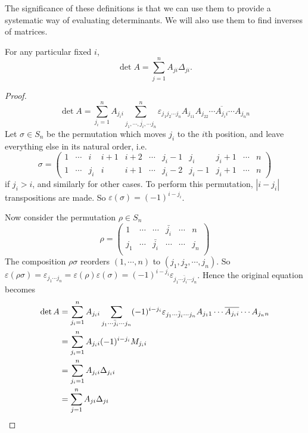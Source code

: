 \documentclass[a4paper]{article}
\begin{document}
The significance of these definitions is that we can use them to provide a systematic way of evaluating determinants. We will also use them to find inverses of matrices.
\begin{thm}
  For any particular fixed $i$,
  \[
    \det A = \sum_{j = 1}^{n} A_{ji}\Delta_{ji}.
  \]
\end{thm}
\begin{proof}
  \[
    \det A = \sum_{j_i = 1}^nA_{j_ii} \sum_{j_1, \cdots, \overline{j_i}, \cdots j_n}^n \varepsilon_{j_1j_2\cdots j_n} A_{j_11}A_{j_22}\cdots \overline{A_{j_ii}}\cdots A_{j_nn}
  \]
  Let $\sigma \in S_n$ be the permutation which moves $j_i$ to the $i$th position, and leave everything else in its natural order, i.e.\setcounter{MaxMatrixCols}{11}
  \[
    \sigma =
    \begin{pmatrix}
      1 &\cdots& i & i + 1 & i + 2 & \cdots &j_i - 1&j_i& j_i + 1 & \cdots & n\\
      1 & \cdots & j_i & i & i + 1 & \cdots & j_i - 2 & j_i - 1 & j_i + 1 & \cdots & n
    \end{pmatrix}
  \]
  if $j_i > i$, and similarly for other cases. To perform this permutation, $|i - j_i|$ transpositions are made. So $\varepsilon(\sigma) = (-1)^{i - j_i}$.

  Now consider the permutation $\rho\in S_n$
  \[
    \rho =
    \begin{pmatrix}
      1 & \cdots & \cdots & \bar {j_i} & \cdots & n\\
      j_1 & \cdots & \bar{j_i} & \cdots & \cdots & j_n\\
    \end{pmatrix}
  \]
  The composition $\rho\sigma$ reorders $(1, \cdots, n)$ to $(j_1, j_2,\cdots, j_n)$. So $\varepsilon(\rho\sigma) = \varepsilon_{j_1\cdots j_n} = \varepsilon(\rho)\varepsilon(\sigma) = (-1)^{i - j_i} \varepsilon_{j_1\cdots \bar j_i \cdots j_n}$. Hence the original equation becomes
  \begin{align*}
    \det A &= \sum_{j_i = 1}^n A_{j_i i} \sum_{j_1\cdots \bar j_i\cdots j_n}(-1)^{i - j_i} \varepsilon_{j_1\cdots \bar j_i \cdots j_n} A_{j_11}\cdots \overline{A_{j_ii}} \cdots A_{j_nn}\\
    &= \sum_{j_i = 1}^n A_{j_ii} (-1)^{i - j_i}M_{j_ii}\\
    &= \sum_{j_i = 1}^{n} A_{j_ii}\Delta_{j_ii}\\
    &= \sum_{j = 1}^{n} A_{ji}\Delta_{ji} \qedhere
  \end{align*} %
\end{proof}
\end{document}
